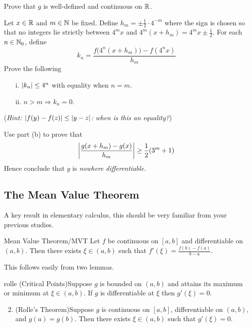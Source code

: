 \begin{exercises}{}
\begin{enumerate}
  \begin{enumeratea}
    \item Prove that $g$ is well-defined and continuous on $\mathbb{R}$.
    \item Let $x\in\mathbb{R}$ and $m\in\mathbb{N}$ be fixed. Define $h_m=\pm\frac 12\cdot 4^{-m}$ where the sign is chosen so that no integers lie strictly between $4^mx$ and $4^m(x+h_m)=4^mx\pm\frac 12$.\smallbreak
    For each $n\in\mathbb{N}_0$, define
    \[
    	k_n =\frac{f\big(4^n(x+h_m)\big)-f(4^nx)}{h_m}
    \]
    Prove the following
    \begin{enumerate}
      \item[i.] $\left| k_n\right|\le 4^n$ with equality when $n=m$.
      \item[ii.] $n>m\Longrightarrow k_n=0$.
    \end{enumerate}
    (\emph{Hint: $\left| f(y)-f(z)\right|\le\left| y-z\right|$: when is this an equality?})

    \item Use part (b) to prove that
    \[
    	\left| \frac{g(x+h_m)-g(x)}{h_m}\right|\ge \frac 12(3^m+1)
    \]
    Hence conclude that $g$ is \emph{nowhere differentiable.}
  \end{enumeratea}
   
	\end{enumerate}
\end{exercises}



\clearpage



\subsection{The Mean Value Theorem}\label{sec:mvt}

A key result in elementary calculus, this should be very familiar from your previous studies.

\begin{thm}{Mean Value Theorem/MVT}{}
	Let $f$ be continuous on $[a,b]$ and differentiable on $(a,b)$. Then there exists $\xi\in(a,b)$ such that $f'(\xi)=\frac{f(b)-f(a)}{b-a}$.
\end{thm}

This follows easily from two lemmas.

\begin{lemm}{}{rolle}
	\exstart (Critical Points)\quad Suppose $g$ is bounded on $(a,b)$ and attains its maximum or minimum at $\xi\in(a,b)$. If $g$ is differentiable at $\xi$ then $g'(\xi)=0$. \vspace{-5pt} %
	\begin{enumerate}\setcounter{enumi}{1}%
	  \item (Rolle's Theorem)\quad Suppose $g$ is continuous on $[a,b]$, differentiable on $(a,b)$, and $g(a)=g(b)$. Then there exists $\xi\in(a,b)$ such that $g'(\xi)=0$. 
	\end{enumerate}
\end{lemm}

